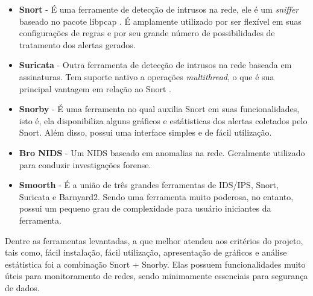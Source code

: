 			\begin{itemize}
				\item \textbf{Snort} - É uma ferramente de detecção de intrusos na rede, ele é um \textit{sniffer} baseado no pacote libpcap \cite{Martin}. É amplamente utilizado por ser flexível em suas configurações de regras e por seu grande número de possibilidades de tratamento dos alertas gerados. 
				\item \textbf{Suricata} - Outra ferramenta de detecção de intrusos na rede baseada em assinaturas. Tem suporte nativo a operações \textit{multithread}, o que é sua principal vantagem em relação ao Snort \cite{Albin}. 
				\item \textbf{Snorby} - É uma ferramenta no qual auxilia Snort em suas funcionalidades, isto é, ela disponibiliza alguns gráficos e estátisticas dos alertas coletados pelo Snort. Além disso, possui uma interface simples e de fácil utilização. 
				\item \textbf{Bro NIDS} - Um NIDS baseado em anomalias na rede. Geralmente utilizado para conduzir investigações forense.
				\item \textbf{Smoorth} - É a união de três grandes ferramentas de IDS/IPS, Snort, Suricata e Barnyard2. Sendo uma ferramenta muito poderosa, no entanto, possui um pequeno grau de complexidade para usuário iniciantes da ferramenta.
			\end{itemize}

		
		Dentre as ferramentas levantadas, a que melhor atendeu aos critérios do projeto, tais como, fácil instalação, fácil utilização, apresentação de gráficos e análise estátistica foi a combinação Snort + Snorby. Elas possuem funcionalidades muito úteis para monitoramento de redes, sendo minimamente essenciais para segurança de dados.
